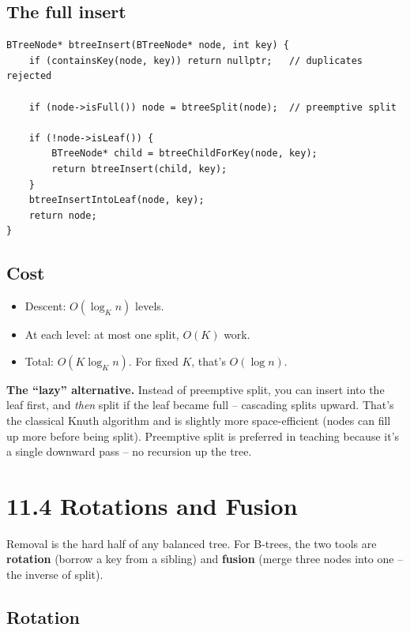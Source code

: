 \documentclass[11pt]{article}
\begin{document}
\subsection*{The full insert}

\begin{lstlisting}[basicstyle=\ttfamily\small,frame=single]
BTreeNode* btreeInsert(BTreeNode* node, int key) {
    if (containsKey(node, key)) return nullptr;   // duplicates rejected

    if (node->isFull()) node = btreeSplit(node);  // preemptive split

    if (!node->isLeaf()) {
        BTreeNode* child = btreeChildForKey(node, key);
        return btreeInsert(child, key);
    }
    btreeInsertIntoLeaf(node, key);
    return node;
}
\end{lstlisting}

\subsection*{Cost}

\begin{itemize}[leftmargin=*]
    \item Descent: $O(\log_K n)$ levels.
    \item At each level: at most one split, $O(K)$ work.
    \item Total: $O(K \log_K n)$. For fixed $K$, that's $O(\log n)$.
\end{itemize}

\begin{warnbox}
\textbf{The ``lazy'' alternative.} Instead of preemptive split, you can insert into the leaf first, and \emph{then} split if the leaf became full -- cascading splits upward. That's the classical Knuth algorithm and is slightly more space-efficient (nodes can fill up more before being split). Preemptive split is preferred in teaching because it's a single downward pass -- no recursion up the tree.
\end{warnbox}

\section{11.4 Rotations and Fusion}

Removal is the hard half of any balanced tree. For B-trees, the two tools are \textbf{rotation} (borrow a key from a sibling) and \textbf{fusion} (merge three nodes into one -- the inverse of split).

\subsection*{Rotation}
\end{document}
